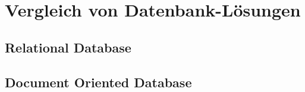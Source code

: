 \section{Vergleich von Datenbank-Lösungen}
\subsection{Relational Database}
\subsection{Document Oriented Database}